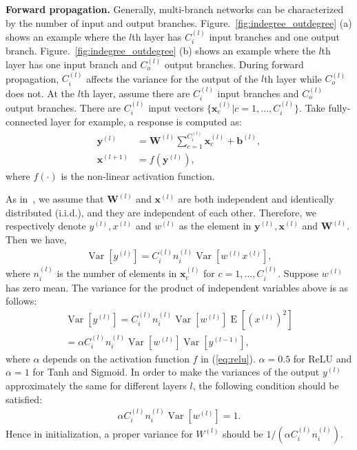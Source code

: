 \documentclass[10pt,twocolumn,letterpaper]{article}
\newcommand{\smalltitle}[1]{\vspace{0.2em}\noindent \textbf{{#1}}}
\newcommand{\W}{\mathbf{W}}
\newcommand{\bb}{\mathbf{b}}
\newcommand{\bx}{\mathbf{x}}
\newcommand{\by}{\mathbf{y}}
\newcommand{\Var}{\operatorname{Var}}
\newcommand{\E}{\operatorname{E}}
\begin{document}
\smalltitle{Forward propagation. }
Generally, multi-branch networks can be characterized by the number of input and output branches. 
Figure.~\ref{fig:indegree_outdegree} (a) shows an example where the $l$th layer has $C_i^{(l)}$ input branches and one output branch. Figure.~\ref{fig:indegree_outdegree} (b) shows an example where the  $l$th layer has one input branch and $C_o^{(l)}$ output branches. 
During forward propagation,  $C_{i}^{(l)}$ affects the variance for the output of the $l$th layer while $C_{o}^{(l)}$ does not. 
At the $l$th layer, assume there are $C_{i}^{(l)}$ input branches and $C_{o}^{(l)}$ output branches. There are $C_{i}^{(l)}$ input vectors $\{\bx_c^{(l)}|c=1, \ldots, C_i^{(l)}\}$.
Take fully-connected layer for example, a response is computed as:
{\small
\begin{align}
\by^{(l)}   &= \W^{(l)}\sum_{c=1}^{C^{(l)}_i}\bx^{(l)}_c + \bb^{(l)}, \\
\bx^{(l+1)} &= f\left(\by^{(l)} \right),\label{eq:relu}
\end{align}
}
\!\!where $f(\cdot)$ is the non-linear activation function.

As in~\cite{glorot2010understanding,he2015delving}, we assume that $\W^{(l)}$ and $\bx^{(l)}$ are both independent and identically distributed (i.i.d.), and they are independent of each other. Therefore, we respectively denote $y^{(l)}, x^{(l)}$ and $w^{(l)}$ as  the element in $\by^{(l)}, \bx^{(l)}$ and $\W^{(l)}$.  Then we have,
{\small
\begin{align}
\Var \left[y^{(l)}\right] = C^{(l)}_in^{(l)}_i \Var\left[w^{(l)} x^{(l)}\right] ,
\end{align}
}
\!\!where $n_i^{(l)}$ is the number of elements in $\bx_c^{(l)}$ for $c=1, \ldots, C_i^{(l)}$. Suppose $w^{(l)}$ has zero mean. The variance for the product of independent variables above is as follows:
{\small
\begin{align*}
\Var \left[y^{(l)}\right] = C^{(l)}_in^{(l)}_i \Var\left[w^{(l)}\right] \E\left[\left(x^{(l)}\right)^2\right] \\
= \alpha C^{(l)}_in^{(l)}_i\Var\left[w^{(l)}\right] \Var \left[y^{(l-1)}\right],
\end{align*}
}
\!\!where $\alpha$ depends on the activation function $f$ in (\ref{eq:relu}). $\alpha=0.5$ for ReLU and $\alpha=1$ for Tanh and Sigmoid. 
In order to make the variances of the output $y^{(l)}$ approximately the same for different layers $l$, the following condition should be satisfied:
{\small
\begin{align}
\alpha C^{(l)}_in^{(l)}_i\Var\left[w^{(l)}\right] = 1.
\end{align}
}
\!\!Hence in initialization, a proper variance for $W^{(l)}$ should be $1/(\alpha C^{(l)}_in^{(l)}_i)$.
\end{document}
